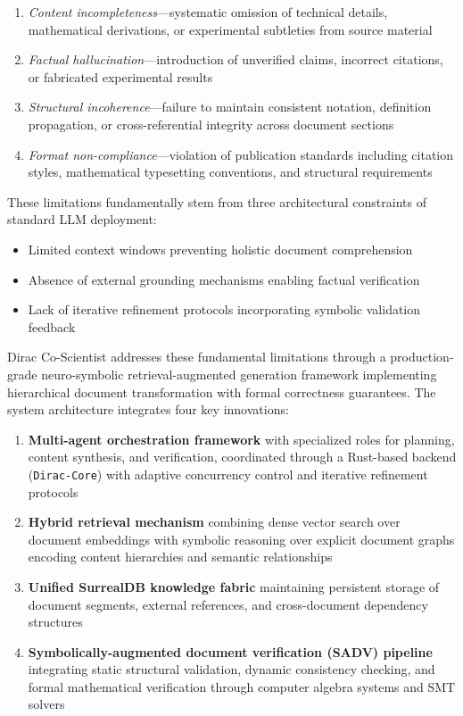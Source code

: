 \documentclass{ieeeaccess}
\begin{document}
\begin{enumerate}
\item \textit{Content incompleteness}---systematic omission of technical details, mathematical derivations, or experimental subtleties from source material
\item \textit{Factual hallucination}---introduction of unverified claims, incorrect citations, or fabricated experimental results
\item \textit{Structural incoherence}---failure to maintain consistent notation, definition propagation, or cross-referential integrity across document sections
\item \textit{Format non-compliance}---violation of publication standards including citation styles, mathematical typesetting conventions, and structural requirements
\end{enumerate}

These limitations fundamentally stem from three architectural constraints of standard LLM deployment:
\begin{itemize}
\item Limited context windows preventing holistic document comprehension
\item Absence of external grounding mechanisms enabling factual verification
\item Lack of iterative refinement protocols incorporating symbolic validation feedback
\end{itemize}

Dirac Co-Scientist addresses these fundamental limitations through a production-grade neuro-symbolic retrieval-augmented generation framework implementing hierarchical document transformation with formal correctness guarantees. The system architecture integrates four key innovations:

\begin{enumerate}
\item \textbf{Multi-agent orchestration framework} with specialized roles for planning, content synthesis, and verification, coordinated through a Rust-based backend (\texttt{Dirac-Core}) with adaptive concurrency control and iterative refinement protocols
\item \textbf{Hybrid retrieval mechanism} combining dense vector search over document embeddings with symbolic reasoning over explicit document graphs encoding content hierarchies and semantic relationships
\item \textbf{Unified SurrealDB knowledge fabric} maintaining persistent storage of document segments, external references, and cross-document dependency structures
\item \textbf{Symbolically-augmented document verification (SADV) pipeline} integrating static structural validation, dynamic consistency checking, and formal mathematical verification through computer algebra systems and SMT solvers
\end{enumerate}
\end{document}
